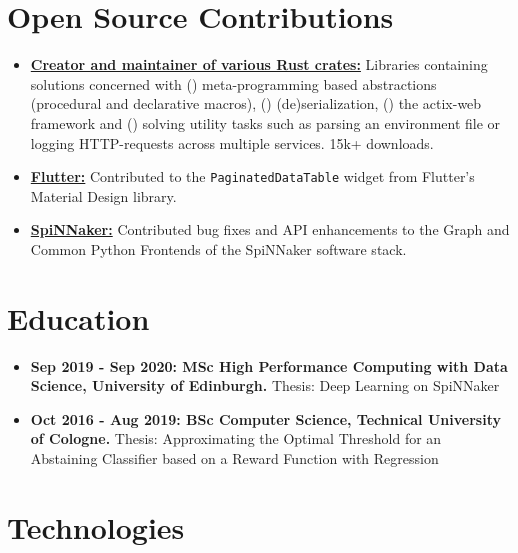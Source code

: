 \documentclass[10pt]{article}
\begin{document}
\section*{Open Source Contributions}

\begin{itemize}[label={}, leftmargin=*]

\item \href{https://crates.io/users/jofas}{\textbf{Creator and maintainer of various
  Rust crates:}}
Libraries containing solutions concerned with ()
meta-programming based abstractions (procedural and declarative
macros), () (de)serialization, ()
the actix-web framework and () solving utility tasks
such as parsing an environment file or logging HTTP-requests across
multiple services. 15k+ downloads.

\item \href{https://github.com/flutter/flutter}{\textbf{Flutter:}}
Contributed to the \texttt{PaginatedDataTable} widget from Flutter's
Material Design library.

\item \href{https://github.com/SpiNNakerManchester}{\textbf{SpiNNaker:}}
Contributed bug fixes and API enhancements to the Graph and Common
Python Frontends of the SpiNNaker software stack.

\end{itemize}

\section*{Education}

\begin{itemize}[label={}, leftmargin=*]

\item \textbf{Sep 2019 - Sep 2020: MSc High Performance Computing with Data
  Science, University of Edinburgh.} Thesis: Deep Learning on SpiNNaker

\item \textbf{Oct 2016 - Aug 2019: BSc Computer Science, Technical
  University of Cologne.} Thesis: Approximating the Optimal Threshold
  for an Abstaining Classifier based on a Reward Function with Regression

\end{itemize}

\section*{Technologies}
\end{document}

